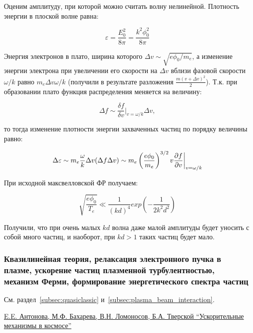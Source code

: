 \documentclass[10pt, a4paper]{article}
\begin{document}
Оценим амплитуду, при которой можно считать волну нелинейной. Плотность энергии в плоской волне равна:

\begin{equation*}
	\varepsilon = \frac{E_0^2}{8 \pi} = \frac {k^2 \phi_0^2}{8 \pi}
\end{equation*}

Энергия электронов в плато, ширина которого $\Delta v \sim \sqrt{e \phi_0 /m_e}$, а изменение энергии электрона при увеличении его скорости на $\Delta v$ вблизи фазовой скорости $\omega/k$ равно $m_e \Delta v \omega /k$ (получили в результате разложения $\frac{m(v+\Delta v)^2}{2}$).
Т.к. при образовании плато функция распределения меняется на величину:

\begin{equation*}
	\Delta f \sim \frac{\delta f}{\delta v}|_{v=\omega/k} \Delta v,
\end{equation*}

то тогда изменение плотности энергии захваченных частиц по порядку величины равно:

\begin{equation*}
	\Delta \varepsilon \sim m_e \frac{\omega}{k} \Delta v (\Delta f \Delta v ) \sim m_e \left(\frac{e \phi_0}{m_e}\right)^{3/2} v \pdv{f}{v}\bigg|_{v=\omega/k} 
\end{equation*}

При исходной максвелловской ФР получаем:

\begin{equation*}
	\sqrt{\frac{e \phi_0}{T_e}} \ll \frac{1}{(kd)^4} exp\left(-\frac{1}{2k^2 d^2}\right) 
\end{equation*}

Получили, что при очень малых $kd$ волна даже малой амплитуды будет уносить с собой много частиц, и наоборот, при $kd > 1$  таких частиц будет мало.

\subsubsection{Квазилинейная теория, релаксация электронного пучка в плазме, ускорение частиц плазменной турбулентностью, механизм Ферми, формирование энергетического спектра частиц}

См. раздел~\ref{subsec:quasiclassic} и~\ref{subsec:plasma_beam_interaction}.

\href{http://space.msu.ru/abmn/ant/ablt/glava_5.htm}{E.E. Антонова, М.Ф. Бахарева, В.Н. Ломоносов, Б.А. Тверской ``Ускорительные механизмы в космосе''}
\end{document}

